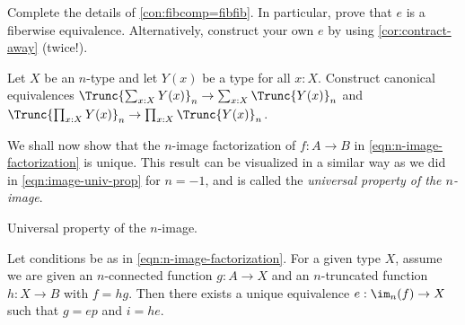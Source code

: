 \begin{xca}\label{xca:fibcomp=fibfib}
Complete the details of \cref{con:fibcomp=fibfib}.
In particular, prove that $e$ is a fiberwise equivalence.
Alternatively, construct your own $e$ by using \cref{cor:contract-away} (twice!).
\end{xca}

\begin{xca}\label{xca:pullout-base-type}
Let $X$ be an $n$-type and let $Y(x)$ be a type for all $x:X$.
Construct canonical equivalences
$\Trunc{\sum_{x:X} Y(x)}_n \to \sum_{x:X} \Trunc{Y(x)}_n$  and
$\Trunc{\prod_{x:X} Y(x)}_n \to \prod_{x:X} \Trunc{Y(x)}_n$.
\end{xca}

We shall now show that the $n$-image factorization
of $f:A\to B$ in \cref{eqn:n-image-factorization} is unique.
This result can be visualized in a similar way as we
did in \cref{eqn:image-univ-prop} for $n=-1$,
and is called the \emph{universal property of the $n$-image}.

\begin{marginfigure}
\noindent{}
\caption{Universal property of the $n$-image.}
\label{fig:n-image-univ-prop}
\end{marginfigure}

\begin{theorem}\label{thm:n-im-univ-prop}
Let conditions be as in \cref{eqn:n-image-factorization}.
For a given type $X$, assume we are given an $n$-connected
function $g:A\to X$ and an $n$-truncated function $h:X\to B$ with $f=hg$.
Then there exists a unique equivalence $e: \im_n(f)\to X$
such that $g=ep$ and $i=he$.
\end{theorem}

